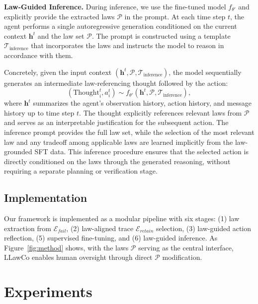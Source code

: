 \documentclass{article}
\theoremstyle{plain}
\theoremstyle{definition}
\theoremstyle{remark}
\newcommand{\name}{LLawCo\xspace}
\begin{document}
\textbf{Law-Guided Inference.} 
During inference, we use the fine-tuned model $f_{\theta'}$ and explicitly provide the extracted laws $\mathcal{P}$ in the prompt. At each time step $t$, the agent performs a single autoregressive generation conditioned on the current context $\mathbf{h}^t$ and the law set $\mathcal{P}$. The prompt is constructed using a template $\mathcal{T}_{\text{inference}}$ that incorporates the laws and instructs the model to reason in accordance with them.

Concretely, given the input context $(\mathbf{h}^t, \mathcal{P}, \mathcal{T}_{\text{inference}})$, the model sequentially generates an intermediate law-referencing thought followed by the action:
\begin{equation}
(\text{Thought}_i^t, a_i^t) \sim f_{\theta'}(\mathbf{h}^t, \mathcal{P}, \mathcal{T}_{\text{inference}}),
\end{equation}
where $\mathbf{h}^t$ summarizes the agent’s observation history, action history, and message history up to time step $t$. The thought explicitly references relevant laws from $\mathcal{P}$ and serves as an interpretable justification for the subsequent action. The inference prompt provides the full law set, while the selection of the most relevant law and any tradeoff among applicable laws are learned implicitly from the law-grounded SFT data. This inference procedure ensures that the selected action is directly conditioned on the laws through the generated reasoning, without requiring a separate planning or verification stage.

\subsection{Implementation}

Our framework is implemented as a modular pipeline with six stages: (1) law extraction from $\mathcal{E}_{fail}$, (2) law-aligned trace $\mathcal{E}_{retain}$ selection, (3) law-guided action reflection, (5) supervised fine-tuning, and (6) law-guided inference. As Figure~\ref{fig:method} shows, with the laws $\mathcal{P}$ serving as the central interface, \name enables human oversight through direct $\mathcal{P}$ modification.

\section{Experiments}
\end{document}
